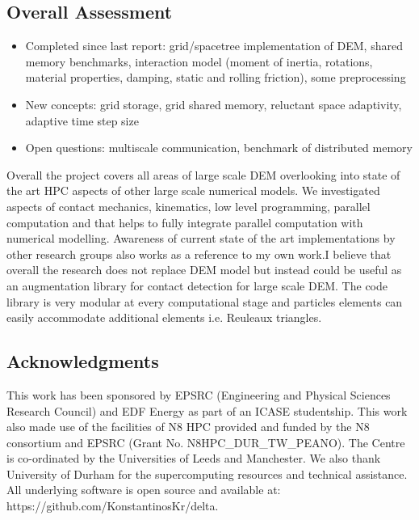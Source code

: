 \documentclass[times,12pt]{article}
\begin{document}
\subsection{Overall Assessment}

\vspace{5mm}
\begin{itemize}
\item Completed since last report: grid/spacetree implementation of DEM, shared memory benchmarks, interaction model (moment of inertia, rotations, material properties, damping, static and rolling friction), some preprocessing
\item New concepts: grid storage, grid shared memory, reluctant space adaptivity, adaptive time step size
\item Open questions: multiscale communication, benchmark of distributed memory
\end{itemize}

Overall the project covers all areas of large scale DEM overlooking into state of the art HPC aspects of other large scale numerical models. We investigated aspects of contact mechanics, kinematics, low level programming, parallel computation and that helps to fully integrate parallel computation with numerical modelling. Awareness of current state of the art implementations by other research groups also works as a reference to my own work.I believe that overall the research does not replace DEM model but instead could be useful as an augmentation library for contact detection for large scale DEM. The code library is very modular at every computational stage and particles elements can easily accommodate additional elements i.e. Reuleaux triangles.   
 
\subsection{Acknowledgments}
This work has been sponsored by EPSRC (Engineering and Physical Sciences Research Council) and EDF Energy as part of an ICASE studentship. This work also made use of the facilities of N8 HPC provided and funded by the N8 consortium and EPSRC (Grant No. N8HPC{\_}DUR{\_}TW{\_}PEANO). The Centre is co-ordinated by the Universities of Leeds and Manchester. We also thank University of Durham for the supercomputing resources and technical assistance. All underlying software is open source and available at: https://github.com/KonstantinosKr/delta.



\end{document}
